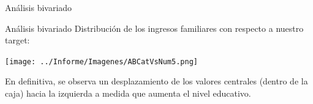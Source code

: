 \documentclass[pdf]{beamer}
\begin{document}
{\begin{frame}{Análisis bivariado}
\end{frame}
 
 
 
\begin{frame}{Análisis bivariado}
    Distribución de los ingresos familiares con respecto a nuestro target:
    \begin{center}
        \texttt{[image: ../Informe/Imagenes/ABCatVsNum5.png]}
    \end{center}
    En definitiva, se observa un desplazamiento de los valores centrales (dentro de la caja) hacia la izquierda a medida que aumenta el nivel educativo.
\end{frame}
}
\end{document}
